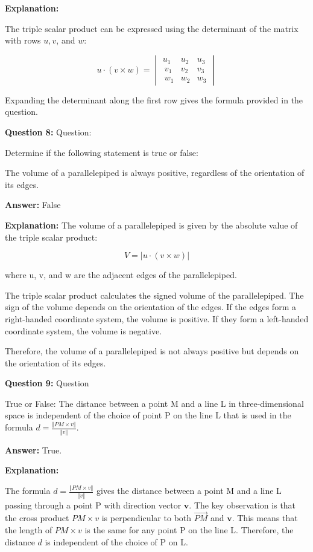 \documentclass{article}
\begin{document}
\textbf{Explanation:} 

The triple scalar product can be expressed using the determinant of the matrix with rows $u, v$, and $w$:

$$u \cdot (v \times w) = \begin{vmatrix} u_1 & u_2 & u_3 \\\ v_1 & v_2 & v_3 \\\ w_1 & w_2 & w_3 \end{vmatrix}$$

Expanding the determinant along the first row gives the formula provided in the question.

\pagebreak 

    
\textbf {Question 8:} Question:

Determine if the following statement is true or false:

The volume of a parallelepiped is always positive, regardless of the orientation of its edges.

\textbf{Answer:} False

\textbf{Explanation:} The volume of a parallelepiped is given by the absolute value of the triple scalar product:

$$V = |u\cdot (v \times w)|$$

where u, v, and w are the adjacent edges of the parallelepiped.

The triple scalar product calculates the signed volume of the parallelepiped. The sign of the volume depends on the orientation of the edges. If the edges form a right-handed coordinate system, the volume is positive. If they form a left-handed coordinate system, the volume is negative.

Therefore, the volume of a parallelepiped is not always positive but depends on the orientation of its edges.

\pagebreak 

    
\textbf {Question 9:} Question

True or False: The distance between a point M and a line L in three-dimensional space is independent of the choice of point P on the line L that is used in the formula $d = \frac{\Vert PM \times v \Vert}{\Vert v \Vert}$.

\textbf{Answer:} 
True.

\textbf{Explanation:} 

The formula $d = \frac{\Vert PM \times v \Vert}{\Vert v \Vert}$ gives the distance between a point M and a line L passing through a point P with direction vector $\mathbf{v}$. The key observation is that the cross product $PM \times v$ is perpendicular to both $\overrightarrow{PM}$ and $\mathbf{v}$. This means that the length of $PM \times v$ is the same for any point P on the line L. Therefore, the distance $d$ is independent of the choice of P on L.
\end{document}
